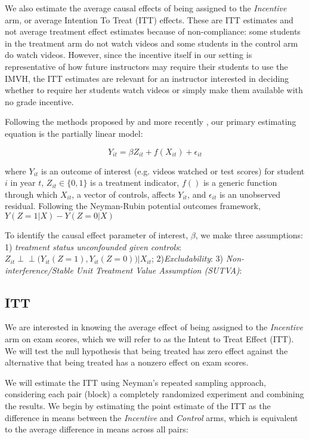 \documentclass[12pt]{article}
\begin{document}
We also estimate the average causal effects of being assigned to the \textit{Incentive} arm, or average Intention To Treat (ITT) effects. These are ITT estimates and not average treatment effect estimates because of non-compliance: some students in the treatment arm do not watch videos and some students in the control arm do watch videos. However, since the incentive itself in our setting is representative of how future instructors may require their students to use the IMVH, the ITT estimates are relevant for an instructor interested in deciding whether to require her students watch videos or simply make them available with no grade incentive.

Following the methods proposed by \textcite{robinson1988} and more recently \textcite{wa2018}, our primary estimating equation is the partially linear model:

\begin{equation}
	Y_{it} = \beta Z_{it} + f(X_{it}) + \epsilon_{it}
\end{equation}

where $Y_{it}$ is an outcome of interest (e.g. videos watched or test scores) for student $i$ in year $t$, $Z_{it} \in \{0,1\}$ is a treatment indicator, $f()$ is a generic function through which $X_{it}$, a vector of controls, affects $Y_{it}$, and $\epsilon_{it}$ is an unobserved residual. Following the Neyman-Rubin potential outcomes framework, $Y(Z=1|X) - Y(Z=0|X)$

To identify the causal effect parameter of interest, $\beta$, we make three assumptions: 1) \textit{treatment status unconfounded given controls}: $Z_{it} \perp \!\!\! \perp \Big(Y_{it}(Z=1), Y_{it}(Z=0)\Big) \Big| X_{it}$; 2)\textit{Excludability}: 3) \textit{Non-interference/Stable Unit Treatment Value Assumption (SUTVA)}:



\subsection{ITT}

We are interested in knowing the average effect of being assigned to the \textit{Incentive} arm on exam scores, which we will refer to as the Intent to Treat Effect (ITT). We will test the null hypothesis that being treated has zero effect against the alternative that being treated has a nonzero effect on exam scores. %

We will estimate the ITT using Neyman's \citeyear{neyman1935} repeated sampling approach, considering each pair (block) a completely randomized experiment and combining the results. We begin by estimating the point estimate of the ITT as the difference in means between the \textit{Incentive} and \textit{Control} arms, which is equivalent to the average difference in means across all pairs:
\end{document}
